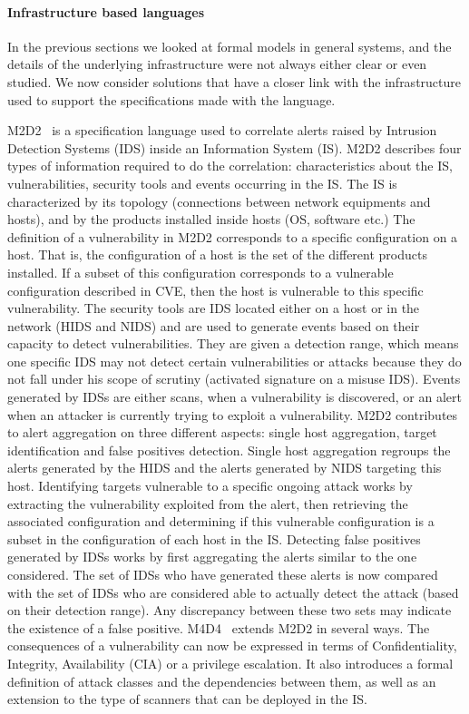 \paragraph{Infrastructure based languages}
In the previous sections we looked at formal models in general systems, and the details of the underlying infrastructure were not always either clear or even studied. We now consider solutions that have a closer link with the infrastructure used to support the specifications made with the language.

M2D2~\cite{M2D2-Morin2002} is a specification language used to correlate alerts raised by Intrusion Detection Systems (IDS) inside an Information System (IS).
M2D2 describes four types of information required to do the correlation: characteristics about the IS, vulnerabilities, security tools and events occurring in the IS.
The IS is characterized by its topology (connections between network equipments and hosts), and by the products installed inside hosts (\eg OS, software etc.)
The definition of a vulnerability in M2D2 corresponds to a specific configuration on a host.
That is, the configuration of a host is the set of the different products installed.
If a subset of this configuration corresponds to a vulnerable configuration described in CVE, then the host is vulnerable to this specific vulnerability.
The security tools are IDS located either on a host or in the network (HIDS and NIDS) and are used to generate events based on their capacity to detect vulnerabilities.
They are given a detection range, which means one specific IDS may not detect certain vulnerabilities or attacks because they do not fall under his scope of scrutiny (\eg activated signature on a misuse IDS).
Events generated by IDSs are either scans, when a vulnerability is discovered, or an alert when an attacker is currently trying to exploit a vulnerability.
M2D2 contributes to alert aggregation on three different aspects: single host aggregation, target identification and false positives detection.
Single host aggregation regroups the alerts generated by the HIDS and the alerts generated by NIDS targeting this host.
Identifying targets vulnerable to a specific ongoing attack works by extracting the vulnerability exploited from the alert, then retrieving the associated configuration and determining if this vulnerable configuration is a subset in the configuration of each host in the IS.
Detecting false positives generated by IDSs works by first aggregating the alerts similar to the one considered.
The set of IDSs who have generated these alerts is now compared with the set of IDSs who are considered able to actually detect the attack (based on their detection range).
Any discrepancy between these two sets may indicate the existence of a false positive.
M4D4~\cite{M4D4-Morin2008} extends M2D2 in several ways. The consequences of a vulnerability can now be expressed in terms of Confidentiality, Integrity, Availability (CIA) or a privilege escalation.
It also introduces a formal definition of attack classes and the dependencies between them, as well as an extension to the type of scanners that can be deployed in the IS.


